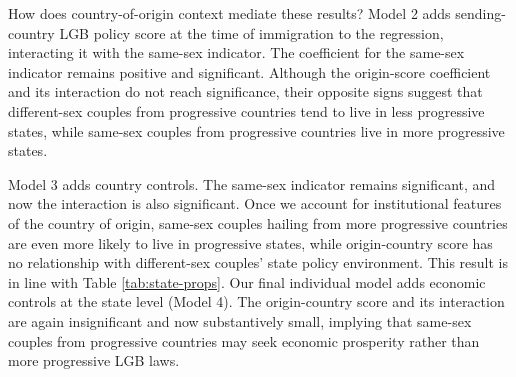 \documentclass[
  12pt,
]{article}
\begin{document}
How does country-of-origin context mediate these results? Model 2 adds sending-country LGB policy score at the time of immigration to the regression, interacting it with the same-sex indicator. The coefficient for the same-sex indicator remains positive and significant. Although the origin-score coefficient and its interaction do not reach significance, their opposite signs suggest that different-sex couples from progressive countries tend to live in less progressive states, while same-sex couples from progressive countries live in more progressive states.

Model 3 adds country controls. The same-sex indicator remains significant, and now the interaction is also significant. Once we account for institutional features of the country of origin, same-sex couples hailing from more progressive countries are even more likely to live in progressive states, while origin-country score has no relationship with different-sex couples' state policy environment. This result is in line with Table \ref{tab:state-props}. Our final individual model adds economic controls at the state level (Model 4). The origin-country score and its interaction are again insignificant and now substantively small, implying that same-sex couples from progressive countries may seek economic prosperity rather than more progressive LGB laws.
\end{document}
